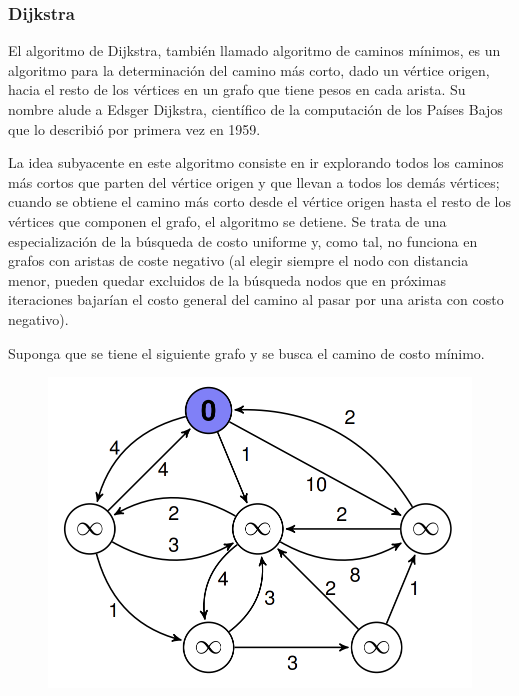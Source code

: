 \subsubsection{Dijkstra}
El algoritmo de Dijkstra, también llamado algoritmo de caminos mínimos, es un algoritmo para la determinación del camino más corto, dado un vértice origen, hacia el resto de los vértices en un grafo que tiene pesos en cada arista. Su nombre alude a Edsger Dijkstra, científico de la computación de los Países Bajos que lo describió por primera vez en 1959.

La idea subyacente en este algoritmo consiste en ir explorando todos los caminos más cortos que parten del vértice origen y que llevan a todos los demás vértices; cuando se obtiene el camino más corto desde el vértice origen hasta el resto de los vértices que componen el grafo, el algoritmo se detiene. Se trata de una especialización de la búsqueda de costo uniforme y, como tal, no funciona en grafos con aristas de coste negativo (al elegir siempre el nodo con distancia menor, pueden quedar excluidos de la búsqueda nodos que en próximas iteraciones bajarían el costo general del camino al pasar por una arista con costo negativo).

Suponga que se tiene el siguiente grafo y se busca el camino de costo mínimo.
\begin{figure}[h]
    \centering
    \includegraphics[scale=0.5]{estáticos/figura8.png}
\end{figure}

